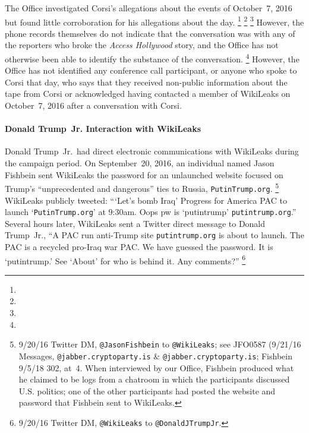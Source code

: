 The Office investigated Corsi's allegations about the events of October~7, 2016 but found little corroboration for his allegations about the day.%
\footnote{ }
\footnote{}
\footnote{  }
However, the phone records themselves do not indicate that the conversation was with any of the reporters who broke the \textit{Access Hollywood} story, and the Office has not otherwise been able to identify the substance of the conversation.
\footnote{    }
However, the Office has not identified any conference call participant, or anyone who spoke to Corsi that day, who says that they received non-public information about the tape from Corsi or acknowledged having contacted a member of WikiLeaks on October~7, 2016 after a conversation with Corsi.

\paragraph{Donald Trump~Jr. Interaction with WikiLeaks}

Donald Trump~Jr.\ had direct electronic communications with WikiLeaks during the campaign period.
On September~20, 2016, an individual named Jason Fishbein sent WikiLeaks the password for an unlaunched website focused on Trump's ``unprecedented and dangerous'' ties to Russia, \verb+PutinTrump.org+.%
\footnote{9/20/16 Twitter DM, \verb+@JasonFishbein+ to \verb+@WikiLeaks+;
see JFO0587 (9/21/16 Messages, \verb+@jabber.cryptoparty.is+ \& \verb+@jabber.cryptoparty.is+;
Fishbein 9/5/18 302, at~4.
When interviewed by our Office, Fishbein produced what he claimed to be logs from a chatroom in which the participants discussed U.S. politics;
one of the other participants had posted the website and password that Fishbein sent to WikiLeaks.}
WikiLeaks publicly tweeted: ``\thinspace`Let's bomb Iraq'
Progress for America PAC to launch `\verb+PutinTrump.org+' at 9:30am. Oops pw is `putintrump' \verb+putintrump.org+.''
Several hours later, WikiLeaks sent a Twitter direct message to Donald Trump~Jr., ``A PAC run anti-Trump site \verb+putintrump.org+ is about to launch.
The PAC is a recycled pro-Iraq war PAC\null.
We have guessed the password.
It is `putintrump.'
See `About' for who is behind it.
Any comments?''%
\footnote{9/20/16 Twitter DM, \verb+@WikiLeaks+ to \verb+@DonaldJTrumpJr+.}

